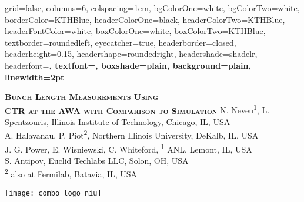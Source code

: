 \documentclass[portrait,final,paperwidth=92cm, paperheight=152cm,  fontscale=0.277]{baposter}
\begin{document}



\begin{poster}{
	grid=false,
	columns=6,
	colspacing=1em,
	bgColorOne=white,
	bgColorTwo=white,
	borderColor=KTHBlue,
	headerColorOne=black,
	headerColorTwo=KTHBlue,
	headerFontColor=white,
	boxColorOne=white,
	boxColorTwo=KTHBlue,
	textborder=roundedleft,
	eyecatcher=true,
	headerborder=closed,
	headerheight=0.15\textheight,
	headershape=roundedright,
	headershade=shadelr,
	headerfont=\Large\bf\textsc, %
	textfont={\setlength{\parindent}{0em}},
	boxshade=plain,
	background=plain,
	linewidth=2pt
}
{
	
} 
{\bf\textsc{Bunch Length Measurements Using \\CTR 
		at the AWA with Comparison to Simulation}}%
{\vspace{1em}
	N. Neveu\textsuperscript{1}, L. Spentzouris, Illinois Institute of Technology, Chicago, IL, USA \\
	A. Halavanau, P. Piot\textsuperscript{2}, Northern Illinois University, DeKalb, IL, USA \\
	J. G. Power, E. Wisniewski, C. Whiteford, \textsuperscript{1} ANL, Lemont, IL, USA \\
	S. Antipov, Euclid Techlabs LLC, Solon, OH, USA \\
	\textsuperscript{2} also at Fermilab, Batavia, IL, USA \\
    }
{%
			\texttt{[image: combo\_logo\_niu]}%

}
\end{poster}
\end{document}
